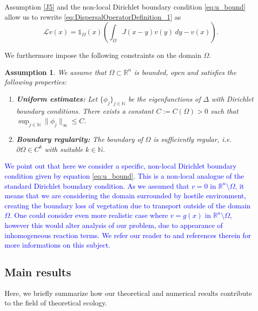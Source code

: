 \documentclass[11pt, a4paper]{article}
\makeatletter
\theoremstyle{break}
\theoremstyle{break}
\theoremstyle{break}
\newtheorem{asm}{Assumption}[section]
\theoremstyle{break}
\theoremstyle{break}
\theoremstyle{break}
\theoremstyle{break}
\theoremstyle{break}
\theoremstyle{break}
\theoremstyle{break}
\newcommand{\mylabel}[2]{#2\def\@currentlabel{#2}\label{#1}}
\makeatother
\begin{document}
Assumption \ref{J5} and the non-local Dirichlet boundary condition \eqref{eq:u_bound} allow us to rewrite \eqref{eq:DispersalOperatorDefinition_1} as
\begin{equation}
    \label{EQ:DispersalOperatorDefinition_2}
    \mathcal{L} v(x) = \mathds{1}_{\Omega}(x) \left(\int_{\Omega} J(x-y) v(y)\:dy - v(x)\right).
\end{equation}

We furthermore impose the following constraints on the domain $\Omega$.

\begin{asm}
\label{assumptions_domain}
We assume that $\Omega \subset \mathbb{R}^n$ is bounded, open and satisfies the following properties:
\begin{enumerate}[label=\textnormal{(\arabic*)}, leftmargin=2em]
    \item[\mylabel{O1}{(O1)}] \textbf{Uniform estimates:} 
    Let $\{\phi_j\}_{j \in \mathbb{N}}$ be the eigenfunctions of $\Delta$ with Dirichlet boundary conditions. There exists a constant $C := C(\Omega) > 0$ such that $\sup_{j \in \mathbb{N}}\|\phi_j\|_\infty \leq C$.

    \item[\mylabel{O2}{(O2)}] \textbf{Boundary regularity:} 
    The boundary of $\Omega$ is sufficiently regular, i.e.\ $\partial\Omega \in C^k$ with suitable $k \in \mathbb{N}$.
\end{enumerate}
\end{asm}

\textcolor{blue}{We point out that here we consider a specific, non-local Dirichlet boundary condition given by equation \eqref{eq:u_bound}. This is a non-local analogue of the standard Dirichlet boundary condition. As we assumed that $v = 0$ in $\mathbb{R}^n \setminus \Omega$, it means that we are considering the domain surrounded by hostile environment, creating the boundary loss of vegetation due to transport outside of the domain $\Omega$. One could consider even more realistic case where $v = g(x)$ in  $\mathbb{R}^n \setminus \Omega$, however this would alter analysis of our problem, due to appearance of inhomogeneous reaction terms. We refer our reader to \cite{MolinoRossi2016} and references therein for more informations on this subject.}

\subsection{Main results}

Here, we briefly summarize how our theoretical and numerical results contribute to the field of theoretical ecology.
\end{document}
